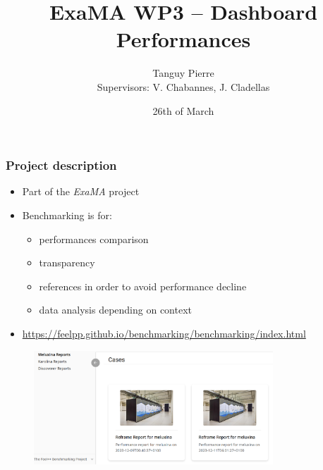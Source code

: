 \documentclass[10pt]{beamer}
\title{\textbf{ExaMA WP3 -- Dashboard Performances}}
\author[Tanguy PIERRE]{Tanguy Pierre\\[1cm] \small{Supervisors: V. Chabannes, J. Cladellas}}
\institute{University of Strasbourg}
\date{26th of March}
\begin{document}
\frame{\titlepage}


\begin{frame}
    \frametitle{\textbf{Project description}}

    \begin{itemize}
        \addtolength{\itemsep}{10pt}
        \item Part of the \textit{ExaMA} project
        \item Benchmarking is for:
        \begin{itemize}
            \item performances comparison
            \item transparency
            \item references in order to avoid performance decline
            \item data analysis depending on context
        \end{itemize}
        \item {\footnotesize\url{https://feelpp.github.io/benchmarking/benchmarking/index.html}}
    \end{itemize}
    \begin{figure}
        \centering
        \includegraphics[width=0.8\textwidth]{../../illustrations/feelpp-dashboard.png}
      \end{figure}
\end{frame}
\end{document}
